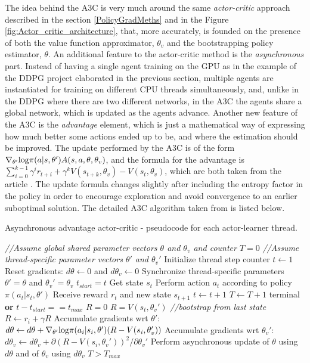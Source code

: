 The idea behind the A3C is very much around the same \textit{actor-critic} approach described in the section \ref{PolicyGradMeths} and in the Figure \ref{fig:Actor_critic_architecture}, that, more accurately, is founded on the presence of both the value function approximator, $\theta_{v}$ and the bootstrapping policy estimator, $\theta$. An additional feature to the actor-critic method is the \textit{asynchronous} part. Instead of having a single agent training on the GPU as in the example of the DDPG project elaborated in the previous section, multiple agents are instantiated for training on different CPU threads simultaneously, and, unlike in the DDPG where there are two different networks, in the A3C the agents share a global network, which is updated as the agents advance. Another new feature of the A3C is the \textit{advantage} element, which is just a mathematical way of expressing how much better some actions ended up to be, and where the estimation should be improved. The update performed by the A3C is of the form $\nabla_{\theta'}\textup{log}\pi(a|s,\theta')A(s,a,\theta,\theta_{v})$, and the formula for the advantage is $\sum_{i=0}^{k-1}\gamma^{i}r_{t+i}+\gamma^kV(s_{t+k},\theta_{v})-V(s_{t},\theta_{v})$, which are both taken from the article \cite{DBLP:journals/corr/MnihBMGLHSK16}. The update formula changes slightly after including the entropy factor in the policy in order to encourage exploration and avoid convergence to an earlier suboptimal solution. The detailed A3C algorithm taken from \cite{DBLP:journals/corr/MnihBMGLHSK16} is listed below.
\begin{algorithm}[H]
	\caption{Asynchronous advantage actor-critic - pseudocode for each actor-learner thread.}
	\label{algo:A3C}
	\begin{algorithmic}
		\State \textit{//Assume global shared parameter vectors $\theta$ and $\theta_{v}$ and counter $T=0$}
		\State \textit{//Assume thread-specific parameter vectors $\theta'$ and $\theta_{v}'$}
		\State Initialize thread step counter $t\leftarrow1$
		\Repeat
		\State Reset gradients: $d\theta\leftarrow 0$ and $d\theta_{v}\leftarrow0$
		\State Synchronize thread-specific parameters $\theta'=\theta$ and $\theta_{v}'=\theta_{v}$
		\State $t_{start}=t$
		\State Get state $s_{t}$
		\Repeat
		\State Perform action $a_{t}$ according to policy $\pi(a_{t}|s_{t}, \theta')$
		\State Receive reward $r_{t}$ and new state $s_{t+1}$
		\State $t\leftarrow t+1$
		\State $T\leftarrow T+1$
		\Until terminal \textbf{or} $t-t_{start}==t_{max}$
		\State $R=0$
		\Else 
		\State $R=V(s_{t},\theta_{v}')$ \textit{//bootstrap from last state }
		\EndIf
		\State $R\leftarrow r_{i}+\gamma R$
		\State Accumulate gradients wrt $\theta'$:
		\State $d\theta\leftarrow d\theta+\nabla_{\theta'}\textup{log}\pi(a_{i}|s_{i},\theta')(R-V(s_{i},\theta_{v}'))$
		\State Accumulate gradients wrt $\theta_{v}'$:
		\State $d\theta_{v}\leftarrow d\theta_{v} + \partial (R-V(s_{i},\theta_{v}'))^2/ \partial\theta_{v}'$
		\EndFor
		\State Perform asynchronous update of $\theta$ using $d\theta$ and of $\theta_{v}$ using $d\theta_{v}$
		\Until $T>T_{max}$
	\end{algorithmic}
\end{algorithm}

